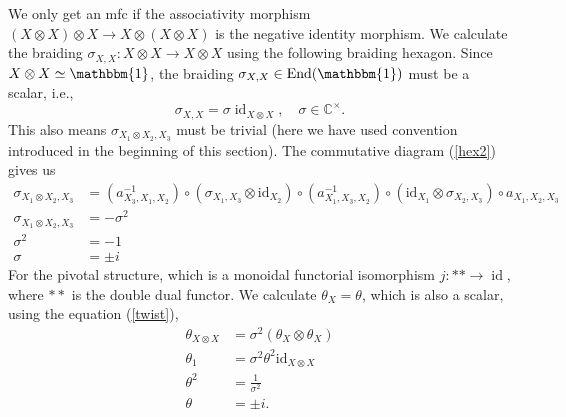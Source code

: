\documentclass[11pt]{book}
\theoremstyle{Rem}
\theoremstyle{definition}
\numberwithin{equation}{section}
\newcommand\inv{^{-1}}
\newcommand\id{\operatorname{id}}
\newcommand{\ie}{i.e.,}
\newcommand\CC{\mathbb C}
\begin{document}
 We only get an mfc if the associativity morphism $(X\otimes X) \otimes X\rightarrow X\otimes (X\otimes X)$ is the negative identity morphism. We calculate the braiding $\sigma_{X,X}: X\otimes X \rightarrow X\otimes X$ using the following braiding hexagon.
 Since $X\otimes X\simeq \mathbbm{1}$, the braiding $\sigma_{X,X}\in \text{End}(\mathbbm{1})$ must be a scalar, \ie \begin{equation}
 	\sigma_{X,X} = \sigma \id_{X\otimes X}, \quad \sigma\in \CC^\times.
 \end{equation} This also means $\sigma_{X_1\otimes X_2, X_3}$ must be trivial (here we have used convention introduced in the beginning of this section). The commutative diagram (\ref{hex2}) gives us
\begin{align}
\sigma_{X_1\otimes X_2, X_3} &=   (a\inv_{X_3,X_1,X_2})\circ (\sigma_{X_1,X_3}\otimes \text{id}_{X_2})\circ(a\inv_{X_1, X_3,X_2}) \circ (\text{id}_{X_1}\otimes \sigma_{X_2, X_3})\circ a_{X_1, X_2, X_3}\nonumber\\
\sigma_{X_1\otimes X_2, X_3} &= - \sigma^2\nonumber\\
\sigma^2 &= -1\nonumber\\
\sigma &= \pm i\nonumber
\end{align} 
For the pivotal structure, which is a monoidal functorial isomorphism $j:**\rightarrow \id$, where $**$ is the double dual functor. We calculate $\theta_X=\theta$, which is also a scalar, using the equation (\ref{twist}), 
 \begin{align}
\theta_{X \otimes X} &= \sigma^2(\theta_X \otimes\theta_X)\nonumber\\
\theta_{1} &= \sigma^2\theta^2\text{id}_{X\otimes X}\nonumber\\
\theta^2 &= \frac{1}{ \sigma^2}\nonumber\\
\theta &= \pm i. \nonumber
 \end{align}
\end{document}
